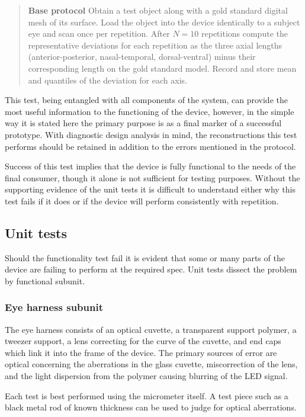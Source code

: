 \documentclass{article}
\begin{document}
\begin{quotation}
\noindent\textbf{Base protocol} Obtain a test object along with a gold standard digital mesh of its surface. Load the object into the device identically to a subject eye and scan once per repetition. After $N = 10$ repetitions compute the representative deviations for each repetition as the three axial lengths (anterior-posterior, nasal-temporal, dorsal-ventral) minus their corresponding length on the gold standard model. Record and store mean and quantiles of the deviation for each axis.
\end{quotation}

This test, being entangled with all components of the system, can provide the most useful information to the functioning of the device, however, in the simple way it is stated here the primary purpose is as a final marker of a successful prototype. With diagnostic design analysis in mind, the reconstructions this test performs should be retained in addition to the errors mentioned in the protocol.

Success of this test implies that the device is fully functional to the needs of the final consumer, though it alone is not sufficient for testing purposes. Without the supporting evidence of the unit tests it is difficult to understand either why this test fails if it does or if the device will perform consistently with repetition.

\subsection{Unit tests}
\label{sec:unit-tests}

Should the functionality test fail it is evident that some or many parts of the device are failing to perform at the required spec. Unit tests dissect the problem by functional subunit.


\subsubsection{Eye harness subunit}
The eye harness consists of an optical cuvette, a transparent support polymer, a tweezer support, a lens correcting for the curve of the cuvette, and end caps which link it into the frame of the device. The primary sources of error are optical concerning the aberrations in the glass cuvette, miscorrection of the lens, and the light dispersion from the polymer causing blurring of the LED signal.

Each test is best performed using the micrometer itself. A test piece such as a black metal rod of known thickness can be used to judge for optical aberrations.
\end{document}
